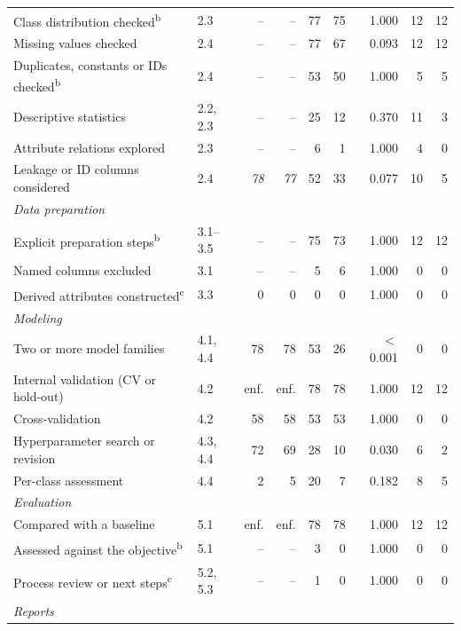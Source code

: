 \begin{table}[htbp]
\begin{tabular}{llrrrrrrr}
    \quad Class distribution checked\textsuperscript{b} & 2.3 & -- & -- & 77 & 75 & 1.000 & 12 & 12 \\
    \quad Missing values checked & 2.4 & -- & -- & 77 & 67 & 0.093 & 12 & 12 \\
    \quad Duplicates, constants or IDs checked\textsuperscript{b} & 2.4 & -- & -- & 53 & 50 & 1.000 & 5 & 5 \\
    \quad Descriptive statistics & 2.2, 2.3 & -- & -- & 25 & 12 & 0.370 & 11 & 3 \\
    \quad Attribute relations explored & 2.3 & -- & -- & 6 & 1 & 1.000 & 4 & 0 \\
    \quad Leakage or ID columns considered & 2.4 & \emph{78} & \emph{77} & 52 & 33 & 0.077 & 10 & 5 \\
    \midrule
    \multicolumn{9}{l}{\emph{Data preparation}} \\
    \quad Explicit preparation steps\textsuperscript{b} & 3.1--3.5 & -- & -- & 75 & 73 & 1.000 & 12 & 12 \\
    \quad Named columns excluded & 3.1 & -- & -- & 5 & 6 & 1.000 & 0 & 0 \\
    \quad Derived attributes constructed\textsuperscript{c} & 3.3 & 0 & 0 & 0 & 0 & 1.000 & 0 & 0 \\
    \midrule
    \multicolumn{9}{l}{\emph{Modeling}} \\
    \quad Two or more model families & 4.1, 4.4 & 78 & 78 & 53 & 26 & $<$0.001 & 0 & 0 \\
    \quad Internal validation (CV or hold-out) & 4.2 & enf. & enf. & 78 & 78 & 1.000 & 12 & 12 \\
    \quad Cross-validation & 4.2 & 58 & 58 & 53 & 53 & 1.000 & 0 & 0 \\
    \quad Hyperparameter search or revision & 4.3, 4.4 & 72 & 69 & 28 & 10 & 0.030 & 6 & 2 \\
    \quad Per-class assessment & 4.4 & 2 & 5 & 20 & 7 & 0.182 & 8 & 5 \\
    \midrule
    \multicolumn{9}{l}{\emph{Evaluation}} \\
    \quad Compared with a baseline & 5.1 & enf. & enf. & 78 & 78 & 1.000 & 12 & 12 \\
    \quad Assessed against the objective\textsuperscript{b} & 5.1 & -- & -- & 3 & 0 & 1.000 & 0 & 0 \\
    \quad Process review or next steps\textsuperscript{c} & 5.2, 5.3 & -- & -- & 1 & 0 & 1.000 & 0 & 0 \\
    \midrule
    \multicolumn{9}{l}{\emph{Reports}} \\

\end{tabular}
\end{table}

